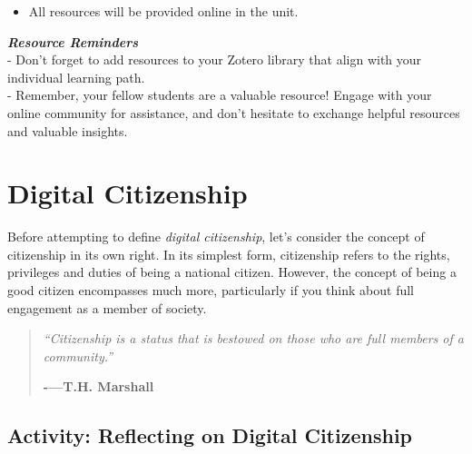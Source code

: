 \documentclass[
]{book}
\providecommand{\tightlist}{%
  \setlength{\itemsep}{0pt}\setlength{\parskip}{0pt}}
\theoremstyle{definition}
\theoremstyle{definition}
\theoremstyle{definition}
\theoremstyle{definition}
\theoremstyle{remark}
\begin{document}
\begin{itemize}
\tightlist
\item
  All resources will be provided online in the unit.
\end{itemize}

\begin{feedback}
\textbf{\emph{Resource Reminders}}\\
- Don't forget to add resources to your Zotero library that align with
your individual learning path.\\
- Remember, your fellow students are a valuable resource! Engage with
your online community for assistance, and don't hesitate to exchange
helpful resources and valuable insights.
\end{feedback}

\hypertarget{digital-citizenship}{%
\section{Digital Citizenship}\label{digital-citizenship}}

Before attempting to define \emph{digital citizenship}, let's consider the concept of citizenship in its own right. In its simplest form, citizenship refers to the rights, privileges and duties of being a national citizen. However, the concept of being a good citizen encompasses much more, particularly if you think about full engagement as a member of society.

\begin{quote}
\emph{``Citizenship is a status that is bestowed on those who are full members of a community.''}

\textbf{-\/---T.H. Marshall}
\end{quote}

\hypertarget{activity-reflecting-on-digital-citizenship}{%
\subsection*{Activity: Reflecting on Digital Citizenship}\label{activity-reflecting-on-digital-citizenship}}
\end{document}

